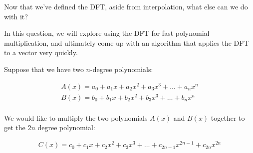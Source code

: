 

Now that we've defined the DFT, aside from interpolation, what else can we do with it?

In this question, we will explore using the DFT for fast polynomial multiplication, and ultimately come up with an algorithm that applies the DFT to a vector very quickly.

Suppose that we have two $n$-degree polynomials:

\begin{align*}
A(x) = a_{0} + a_{1}x + a_{2}x^{2} + a_{3}x^{3} + \dots + a_{n}x^{n}\\
B(x) = b_{0} + b_{1}x + b_{2}x^{2} + b_{3}x^{3} + \dots + b_{n}x^{n}\\
\end{align*}

We would like to multiply the two polynomials $A(x)$ and $B(x)$ together to get the $2n$ degree polynomial:

\begin{align*}
C(x) = c_{0} + c_{1}x + c_{2}x^{2} + c_{3}x^{3} + \dots + c_{2n - 1}x^{2n - 1} + c_{2n}x^{2n}
\end{align*}

